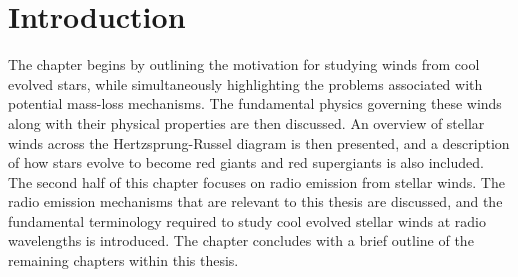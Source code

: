 \chapter{Introduction} \label{chap:1}
\vspace{-1cm}
The chapter begins by outlining the motivation for studying winds from cool evolved stars, while simultaneously highlighting the problems associated with potential mass-loss mechanisms. The fundamental physics governing these winds along with their physical properties are then discussed. An overview of stellar winds across the Hertzsprung-Russel diagram is then presented, and a description of how stars evolve to become red giants and red supergiants is also included. The second half of this chapter focuses on radio emission from stellar winds. The radio emission mechanisms that are relevant to this thesis are discussed, and the fundamental terminology required to study cool evolved stellar winds at radio wavelengths is introduced. The chapter concludes with a brief outline of the remaining chapters within this thesis.

\pagebreak

